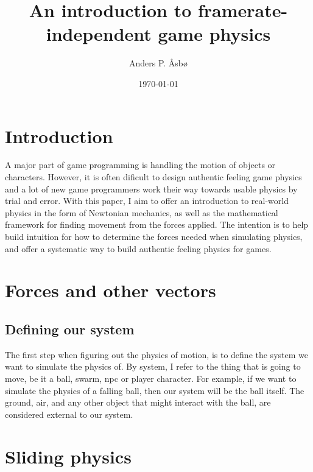 \documentclass[%
notitlepage,
 amsmath,amssymb,
 aps,
]{revtex4-2}  %
\begin{document}
\title{An introduction to framerate-independent game physics}   %
\author{Anders P. Åsbø}               %
\date{\today}                             %
\noaffiliation                            %

\maketitle                                %
\tableofcontents
\newpage

\section{Introduction}
A major part of game programming is handling the motion of objects or characters. However, it is often dificult to design authentic feeling game physics and a lot of new game programmers work their way towards usable physics by trial and error. With this paper, I aim to offer an introduction to real-world physics in the form of Newtonian mechanics, as well as the mathematical framework for finding movement from the forces applied. The intention is to help build intuition for how to determine the forces needed when simulating physics, and offer a systematic way to build authentic feeling physics for games.

\section{Forces and other vectors}
\subsection{Defining our system}
The first step when figuring out the physics of motion, is to define the system we want to simulate the physics of. By system, I refer to the thing that is going to move, be it a ball, swarm, npc or player character. For example, if we want to simulate the physics of a falling ball, then our system will be the ball itself. The ground, air, and any other object that might interact with the ball, are considered external to our system.

\section{Sliding physics}
\end{document}
